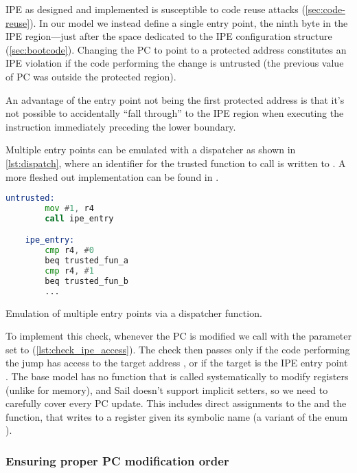 IPE as designed and implemented is susceptible to code reuse attacks (\cref{sec:code-reuse}). In our model we instead define a single entry point, the ninth byte in the IPE region---just after the space dedicated to the IPE configuration structure (\cref{sec:bootcode}). Changing the PC to point to a protected address constitutes an IPE violation if the code performing the change is untrusted (\ie the previous value of PC was outside the protected region).

An advantage of the entry point not being the first protected address is that it's not possible to accidentally ``fall through'' to the IPE region when executing the instruction immediately preceding the lower boundary.

Multiple entry points can be emulated with a dispatcher as shown in \cref{lst:dispatch}, where an identifier for the trusted function to call is written to . A more fleshed out implementation can be found in \cite{entry-dispatch}.

\begin{listing}[b]
  \begin{lstlisting}[language=asm]
    untrusted:
        mov #1, r4
        call ipe_entry

    ipe_entry:
        cmp r4, #0
        beq trusted_fun_a
        cmp r4, #1
        beq trusted_fun_b
        ...
  \end{lstlisting}
  \caption{Emulation of multiple entry points via a dispatcher function.}
  \label{lst:dispatch}
\end{listing}

To implement this check, whenever the PC is modified we call  with the  parameter set to  (\cref{lst:check_ipe_access}). The check then passes only if the code performing the jump has access to the target address , or if the target is the IPE entry point . The base model has no function that is called systematically to modify registers (unlike  for memory), and Sail doesn't support implicit setters, so we need to carefully cover every PC update. This includes direct assignments to the   and the  function, that writes to a register given its symbolic name (a variant of the enum ).

\subsubsection{Ensuring proper PC modification order}
\label{sec:pc-mod-order}


